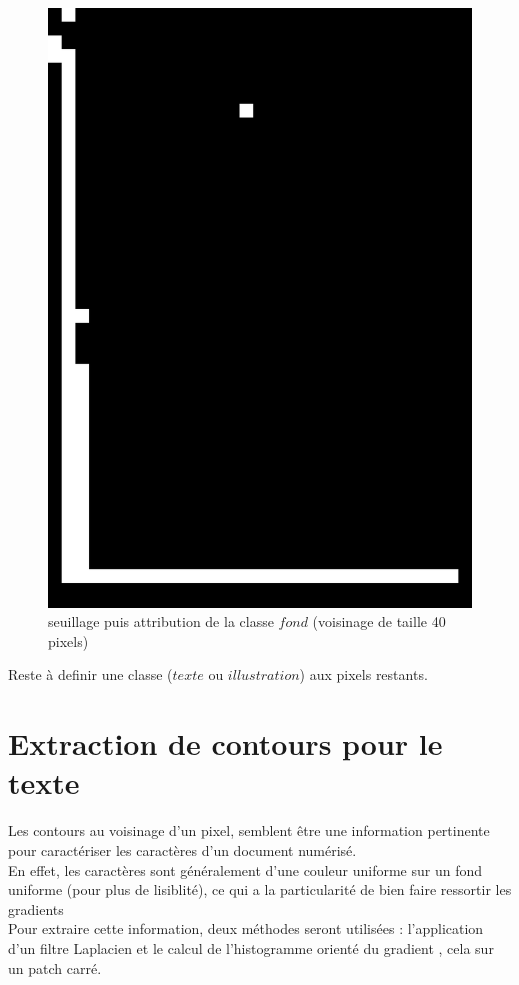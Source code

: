 \documentclass{book}
\begin{document}
\begin{figure}[H]
\begin{center}
\includegraphics[scale=0.075]{images/1g_seuil.jpg}
\end{center}
\caption{seuillage puis attribution de la classe $fond$ (voisinage de taille 40 pixels)}
\label{classe_fond}
\end{figure}

Reste à definir une classe ($texte$ ou $illustration$) aux pixels restants.

\section{Extraction de contours pour le texte}

Les contours au voisinage d'un pixel, semblent être une information pertinente pour caractériser les caractères d'un document numérisé.\\
En effet, les caractères sont généralement d'une couleur uniforme sur un fond uniforme (pour plus de lisiblité), ce qui a la 
particularité de bien faire ressortir les gradients\\
Pour extraire cette information, deux méthodes seront utilisées : l'application d'un filtre Laplacien et le calcul de l'histogramme orienté du gradient 
\cite{Dalal05histogramsof}, cela sur un patch carré. 
\end{document}
